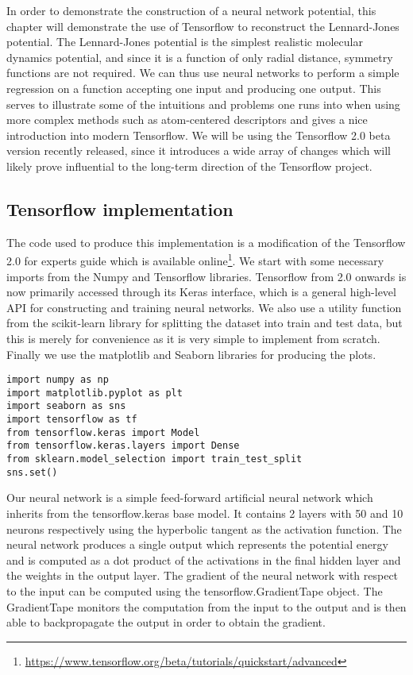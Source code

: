 In order to demonstrate the construction of a neural network
potential, this chapter will demonstrate the use of Tensorflow 
to reconstruct the Lennard-Jones potential.
The Lennard-Jones potential is the simplest
realistic molecular dynamics potential, and since it is a function
of only radial distance, symmetry functions are not required.
We can thus use neural networks to perform a simple regression
on a function accepting one input and producing one output.
This serves to illustrate some of the intuitions and problems
one runs into when using more complex methods such as 
atom-centered descriptors and gives a nice introduction into
modern Tensorflow. We will be using the Tensorflow 2.0
beta version recently released, since it introduces a wide array
of changes which will likely prove influential to the long-term
direction of the Tensorflow project.

\subsection{Tensorflow implementation}
The code used to produce this implementation is
a modification of the Tensorflow 2.0 for experts guide
which is available online\footnote{\url{
https://www.tensorflow.org/beta/tutorials/quickstart/advanced}}.
We start with some necessary imports from the Numpy and Tensorflow
libraries. Tensorflow from 2.0 onwards is now primarily accessed through
its Keras interface, which is a general high-level API for
constructing and training neural networks.
We also use a utility function from the scikit-learn library
for splitting the dataset into train and test data, but this is
merely for convenience as it is very simple to implement from scratch.
Finally we use the matplotlib and Seaborn libraries for
producing the plots.

\begin{verbatim}
import numpy as np
import matplotlib.pyplot as plt
import seaborn as sns
import tensorflow as tf
from tensorflow.keras import Model
from tensorflow.keras.layers import Dense
from sklearn.model_selection import train_test_split
sns.set()
\end{verbatim}

Our neural network is a simple feed-forward artificial neural network
which inherits from the tensorflow.keras base model.
It contains 2 layers with 50 and 10 neurons respectively
using the hyperbolic tangent as the activation function.
The neural network produces a single output which represents
the potential energy and is computed as a dot product 
of the activations in the final hidden layer
and the weights in the output layer.
The gradient of the neural network with respect to the input
can be computed using the tensorflow.GradientTape object.
The GradientTape monitors the computation from the input to the output
and is then able to backpropagate the output in order to obtain
the gradient.


